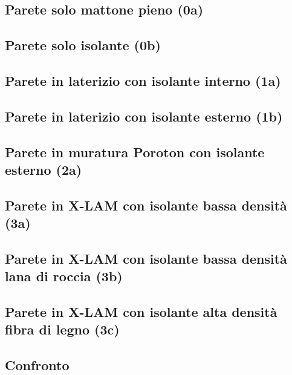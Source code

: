 \documentclass[a4paper,10pt]{report}
\begin{document}
\begin{landscape}
        \clearpage
        \subsection*{Parete solo mattone pieno (0a)}
        
        \clearpage
        \subsection*{Parete solo isolante (0b)}
        
        \clearpage
        \subsection*{Parete in laterizio con isolante interno (1a)}
        
        \clearpage
        \subsection*{Parete in laterizio con isolante esterno (1b)}
        
        \clearpage
        \subsection*{Parete in muratura Poroton con isolante esterno (2a)}
        
        \clearpage
        \subsection*{Parete in X-LAM con isolante bassa densità (3a)}
        
        \clearpage
        \subsection*{Parete in X-LAM con isolante bassa densità lana di roccia (3b)}
        
        \clearpage
        \subsection*{Parete in X-LAM con isolante alta densità fibra di legno (3c)}
        
        \subsection*{Confronto}
        
        \clearpage
        
        \clearpage
        
\end{landscape}
\end{document}
